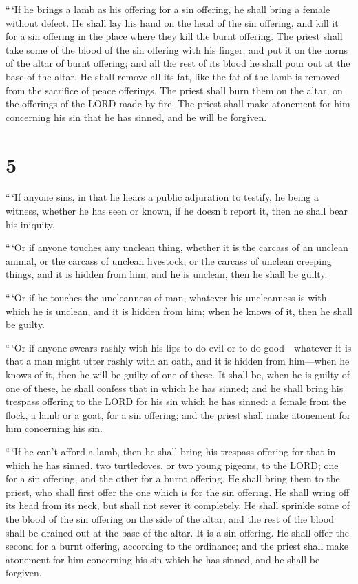  ``\,`If he brings a lamb as his offering for a sin
offering, he shall bring a female without defect.  He shall
lay his hand on the head of the sin offering, and kill it for a sin
offering in the place where they kill the burnt offering. 
The priest shall take some of the blood of the sin offering with his
finger, and put it on the horns of the altar of burnt offering; and all
the rest of its blood he shall pour out at the base of the altar.
 He shall remove all its fat, like the fat of the lamb is
removed from the sacrifice of peace offerings. The priest shall burn
them on the altar, on the offerings of the LORD made by fire. The priest
shall make atonement for him concerning his sin that he has sinned, and
he will be forgiven.

\hypertarget{section-4}{%
\section{5}\label{section-4}}

 ``\,`If anyone sins, in that he hears a public adjuration
to testify, he being a witness, whether he has seen or known, if he
doesn't report it, then he shall bear his iniquity.

 ``\,`Or if anyone touches any unclean thing, whether it is
the carcass of an unclean animal, or the carcass of unclean livestock,
or the carcass of unclean creeping things, and it is hidden from him,
and he is unclean, then he shall be guilty.

 ``\,`Or if he touches the uncleanness of man, whatever his
uncleanness is with which he is unclean, and it is hidden from him; when
he knows of it, then he shall be guilty.

 ``\,`Or if anyone swears rashly with his lips to do evil or
to do good---whatever it is that a man might utter rashly with an oath,
and it is hidden from him---when he knows of it, then he will be guilty
of one of these.  It shall be, when he is guilty of one of
these, he shall confess that in which he has sinned;  and he
shall bring his trespass offering to the LORD for his sin which he has
sinned: a female from the flock, a lamb or a goat, for a sin offering;
and the priest shall make atonement for him concerning his sin.

 ``\,`If he can't afford a lamb, then he shall bring his
trespass offering for that in which he has sinned, two turtledoves, or
two young pigeons, to the LORD; one for a sin offering, and the other
for a burnt offering.  He shall bring them to the priest,
who shall first offer the one which is for the sin offering. He shall
wring off its head from its neck, but shall not sever it completely.
 He shall sprinkle some of the blood of the sin offering on
the side of the altar; and the rest of the blood shall be drained out at
the base of the altar. It is a sin offering.  He shall
offer the second for a burnt offering, according to the ordinance; and
the priest shall make atonement for him concerning his sin which he has
sinned, and he shall be forgiven.

